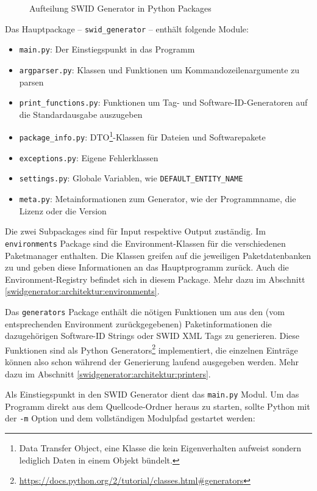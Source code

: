 \begin{figure}[H]
	\centering
	
	\caption{Aufteilung SWID Generator in Python Packages}
\end{figure}

Das Hauptpackage -- \texttt{swid\_generator} -- enthält folgende Module:

\begin{itemize}
	\item \texttt{main.py}: Der Einstiegspunkt in das Programm
	\item \texttt{argparser.py}: Klassen und Funktionen um
		Kommandozeilenargumente zu parsen
	\item \texttt{print\_functions.py}: Funktionen um Tag- und
		Software-ID-Generatoren auf die Standardausgabe auszugeben
	\item \texttt{package\_info.py}: DTO\footnote{Data Transfer Object, eine
		Klasse die kein Eigenverhalten aufweist sondern lediglich Daten in
		einem Objekt bündelt.}-Klassen für Dateien und Softwarepakete
	\item \texttt{exceptions.py}: Eigene Fehlerklassen
	\item \texttt{settings.py}: Globale Variablen, wie \zb
		\texttt{DEFAULT\_ENTITY\_NAME}
	\item \texttt{meta.py}: Metainformationen zum Generator, wie \zb der
		Programmname, die Lizenz oder die Version
\end{itemize}

Die zwei Subpackages sind für Input respektive Output zuständig. Im
\texttt{environments} Package sind die Environment-Klassen für die verschiedenen
Paketmanager enthalten. Die Klassen greifen auf die jeweiligen Paketdatenbanken
zu und geben diese Informationen an das Hauptprogramm zurück. Auch die
Environment-Registry befindet sich in diesem Package. Mehr dazu im Abschnitt
\ref{swidgenerator:architektur:environments}.

Das \texttt{generators} Package enthält die nötigen Funktionen um aus den (vom
entsprechenden Environment zurückgegebenen) Paketinformationen die dazugehörigen
Software-ID Strings oder SWID XML Tags zu generieren. Diese Funktionen sind als
Python
Generators\footnote{\url{https://docs.python.org/2/tutorial/classes.html\#generators}}
implementiert, die einzelnen Einträge können also schon während der Generierung
laufend ausgegeben werden. Mehr dazu im Abschnitt
\ref{swidgenerator:architektur:printers}.

Als Einstiegspunkt in den SWID Generator dient das \texttt{main.py} Modul. Um
das Programm direkt aus dem Quellcode-Ordner heraus zu starten, sollte Python
mit der \texttt{-m} Option und dem vollständigen Modulpfad gestartet werden:

